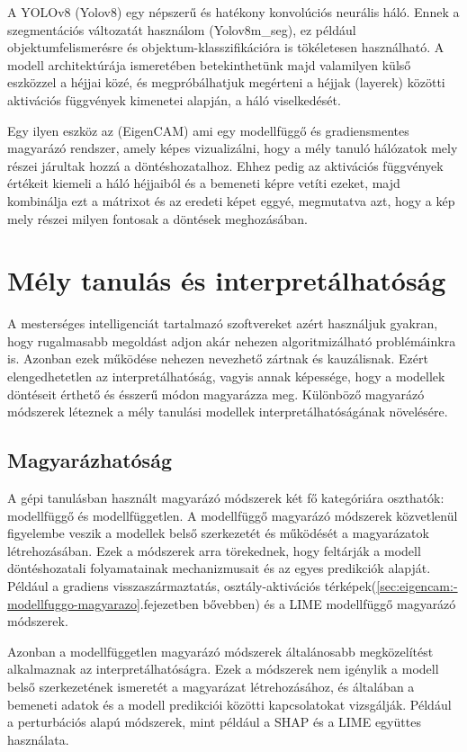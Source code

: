 \documentclass[12pt,oneside,a4paper]{article}
\newcommand{\newsection}[1]{\clearpage\section{#1}}\label{makro}
\theoremstyle{remark}
\begin{document}
    A YOLOv8 (\gls{Yolov8}) egy népszerű és hatékony konvolúciós neurális háló.
    Ennek a szegmentációs változatát használom (Yolov8m\_seg), ez
    például objektumfelismerésre és objektum-klasszifikációra is tökéletesen használható.
    A modell architektúrája ismeretében betekinthetünk majd valamilyen külső eszközzel a héjjai közé,
    és megpróbálhatjuk megérteni a héjjak (layerek) közötti aktivációs függvények kimenetei alapján, a háló viselkedését.

    Egy ilyen eszköz az  (\gls{EigenCAM}) ami egy modellfüggő és gradiensmentes magyarázó rendszer,
    amely képes vizualizálni, hogy a mély tanuló hálózatok mely részei járultak hozzá a döntéshozatalhoz.
    Ehhez pedig
    az aktivációs függvények értékeit kiemeli a háló héjjaiból és a bemeneti képre vetíti ezeket, majd kombinálja
    ezt a mátrixot és az eredeti képet eggyé, megmutatva azt, hogy a kép mely részei milyen fontosak a döntések meghozásában.

\newsection{Mély tanulás és interpretálhatóság}\label{sec:mely-tanulas-es-interpretalhatosag}
A mesterséges intelligenciát tartalmazó szoftvereket azért használjuk gyakran, hogy rugalmasabb megoldást adjon akár
nehezen algoritmizálható problémáinkra is.
Azonban ezek működése nehezen nevezhető zártnak és kauzálisnak.
 Ezért elengedhetetlen az interpretálhatóság, vagyis annak képessége, hogy a modellek
döntéseit érthető és ésszerű módon magyarázza meg.
    Különböző magyarázó módszerek léteznek a mély tanulási modellek interpretálhatóságának növelésére.

\subsection{Magyarázhatóság}\label{subsec:magyarazhatosag}
A gépi tanulásban használt magyarázó módszerek két fő kategóriára oszthatók: modellfüggő és modellfüggetlen.
A modellfüggő magyarázó módszerek közvetlenül figyelembe veszik a modellek belső szerkezetét és működését a magyarázatok
létrehozásában.
Ezek a módszerek arra törekednek, hogy feltárják a modell döntéshozatali folyamatainak mechanizmusait és az
egyes predikciók alapját.
Például a gradiens visszaszármaztatás, osztály-aktivációs térképek(\ref{sec:eigencam:-modellfuggo-magyarazo}.fejezetben bővebben)\label{sechiv}
és a LIME modellfüggő magyarázó módszerek.

Azonban a modellfüggetlen magyarázó módszerek általánosabb megközelítést alkalmaznak az interpretálhatóságra.
Ezek a módszerek nem igénylik a modell belső szerkezetének ismeretét a magyarázat létrehozásához, és általában
a bemeneti adatok és a modell predikciói közötti kapcsolatokat vizsgálják.
Például a perturbációs alapú módszerek, mint például a SHAP és a LIME együttes használata.
\end{document}
